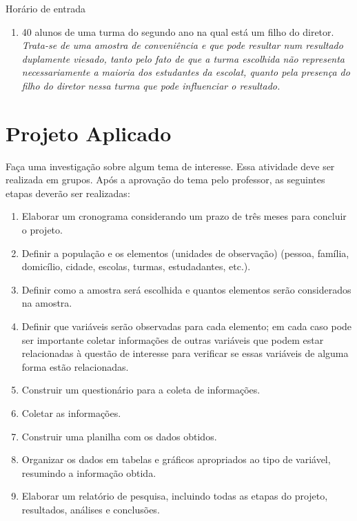 \begin{example}{Horário de entrada}
\begin{enumerate}
\item {} 
40 alunos de uma turma do segundo ano na qual está um filho do diretor. \emph{Trata-se de uma amostra de conveniência e que pode resultar num resultado duplamente viesado, tanto pelo fato de que a turma escolhida não representa necessariamente a maioria dos estudantes da escolat, quanto pela presença do filho do diretor nessa turma que pode influenciar o resultado.}

\end{enumerate}
\end{example}


\section{Projeto Aplicado}
\label{\detokenize{PE103-A:projeto}}\label{\detokenize{PE103-A:id1}}

Faça uma investigação sobre algum tema de interesse. Essa atividade deve ser realizada em grupos.  Após a aprovação do tema pelo professor, as seguintes etapas deverão ser realizadas:
\begin{enumerate}
\item {} 
Elaborar um cronograma considerando um prazo de três meses para concluir o projeto.

\item {} 
Definir a população e os elementos (unidades de observação) (pessoa, família, domicílio, cidade, escolas, turmas, estudadantes, etc.).

\item {} 
Definir como a amostra será escolhida e quantos elementos serão considerados na amostra.

\item {} 
Definir que variáveis serão observadas para cada elemento; em cada caso pode ser importante coletar informações de outras variáveis que podem estar relacionadas à questão de interesse para verificar se essas variáveis de alguma forma estão relacionadas.

\item {} 
Construir um questionário para a coleta de informações.

\item {} 
Coletar as informações.

\item {} 
Construir uma planilha com os dados obtidos.

\item {} 
Organizar os dados em tabelas e gráficos apropriados ao tipo de variável, resumindo a informação obtida.

\item {} 
Elaborar um relatório de pesquisa, incluindo todas as etapas do projeto, resultados, análises e conclusões.

\end{enumerate}


